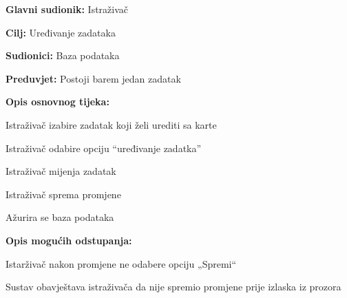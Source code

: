 					\begin{packed_item}
	
						\item \textbf{Glavni sudionik: } Istraživač
						\item  \textbf{Cilj:} Uređivanje zadataka
						\item  \textbf{Sudionici:} Baza podataka
						\item  \textbf{Preduvjet:} Postoji barem jedan zadatak
						\item  \textbf{Opis osnovnog tijeka:}
						
						\item[] \begin{packed_enum}
	
							\item 	Istraživač izabire zadatak koji želi urediti sa karte
							\item Istraživač odabire opciju “uređivanje zadatka”
							\item 	Istraživač mijenja zadatak
							\item 	Istraživač sprema promjene
							\item 	Ažurira se baza podataka
							
						\end{packed_enum}

						\item  \textbf{Opis mogućih odstupanja:}
						
						\item[] \begin{packed_item}
	
							\item[4.a] 	Istarživač nakon promjene ne odabere opciju „Spremi“
							\item[] \begin{packed_enum}
								
								\item Sustav obavještava istraživača da nije spremio promjene prije izlaska iz prozora 
								
							\end{packed_enum}

						\end{packed_item}

					\end{packed_item}%
